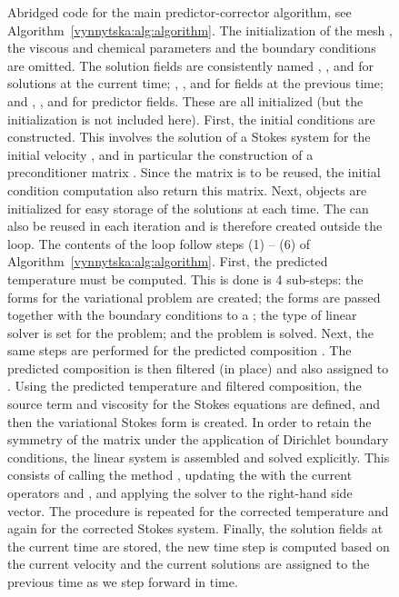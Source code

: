 \begin{figure}
    \caption{Abridged code for the main predictor-corrector algorithm,
      see Algorithm~\ref{vynnytska:alg:algorithm}. The initialization
      of the mesh , the viscous and chemical parameters and
      the boundary conditions are omitted. The solution fields are
      consistently named , , and  for
      solutions at the current time; , ,
      and  for fields at the previous time;
      and , , and  for predictor
      fields. These  are all initialized (but the
      initialization is not included here).
%
      First, the initial conditions are constructed. This involves the
      solution of a Stokes system for the initial velocity ,
      and in particular the construction of a preconditioner matrix
      . Since the matrix is to be reused, the initial
      condition computation also return this matrix. Next,
       objects are initialized for easy storage of
      the solutions at each time. The  can also be
      reused in each iteration and is therefore created outside the
      loop.
%
      The contents of the loop follow steps (1) -- (6) of
      Algorithm~\ref{vynnytska:alg:algorithm}. First, the predicted
      temperature  must be computed. This is done is 4
      sub-steps: the forms for the variational problem are created;
      the forms are passed together with the boundary conditions to a
      ; the type of linear solver is set for
      the problem; and the problem is solved. Next, the same steps are
      performed for the predicted composition . The
      predicted composition is then filtered (in place) and also
      assigned to .
%
      Using the predicted temperature and filtered composition, the
      source term and viscosity for the Stokes equations are defined,
      and then the variational Stokes form is created. In order to
      retain the symmetry of the matrix under the application of
      Dirichlet boundary conditions, the linear system is assembled
      and solved explicitly. This consists of calling the method
      , updating the  with
      the current operators  and , and applying the
      solver to the right-hand side vector. The procedure is repeated
      for the corrected temperature and again for the corrected Stokes
      system.
%
      Finally, the solution fields at the current time are stored, the
      new time step  is computed based on the current velocity
      and the current solutions are assigned to the previous time as
      we step forward in time.}
  \label{vynnytska:fig:mainalgorithm}
\end{figure}

